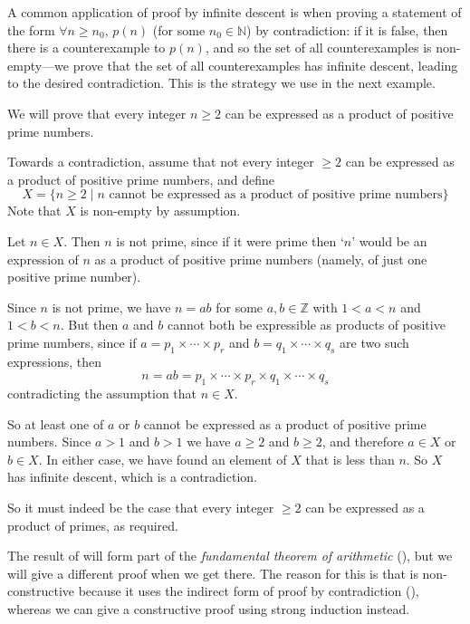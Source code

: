 A common application of proof by infinite descent is when proving a statement of the form $\forall n \ge n_0,\, p(n)$ (for some $n_0 \in \mathbb{N}$) by contradiction: if it is false, then there is a counterexample to $p(n)$, and so the set of all counterexamples is non-empty---we prove that the set of all counterexamples has infinite descent, leading to the desired contradiction. This is the strategy we use in the next example.

\begin{example}
\label{exExistenceOfPrimeFactorisationbyInfiniteDescent}
We will prove that every integer $n \ge 2$ can be expressed as a product of positive prime numbers.

Towards a contradiction, assume that not every integer $\ge 2$ can be expressed as a product of positive prime numbers, and define
\[ X = \{ n \ge 2 \mid n \text{ cannot be expressed as a product of positive prime numbers} \} \]
Note that $X$ is non-empty by assumption.

Let $n \in X$. Then $n$ is not prime, since if it were prime then `$n$' would be an expression of $n$ as a product of positive prime numbers (namely, of just one positive prime number).

Since $n$ is not prime, we have $n=ab$ for some $a,b \in \mathbb{Z}$ with $1<a<n$ and $1<b<n$. But then $a$ and $b$ cannot both be expressible as products of positive prime numbers, since if $a = p_1 \times \cdots \times p_r$ and $b = q_1 \times \cdots \times q_s$ are two such expressions, then
\[ n = ab = p_1 \times \cdots \times p_r \times q_1 \times \cdots \times q_s \]
contradicting the assumption that $n \in X$.

So at least one of $a$ or $b$ cannot be expressed as a product of positive prime numbers. Since $a > 1$ and $b > 1$ we have $a \ge 2$ and $b \ge 2$, and therefore $a \in X$ or $b \in X$. In either case, we have found an element of $X$ that is less than $n$. So $X$ has infinite descent, which is a contradiction.

So it must indeed be the case that every integer $\ge 2$ can be expressed as a product of primes, as required.
\end{example}

The result of  will form part of the \textit{fundamental theorem of arithmetic} (), but we will give a different proof when we get there. The reason for this is that  is non-constructive because it uses the indirect form of proof by contradiction (), whereas we can give a constructive proof using strong induction instead.


